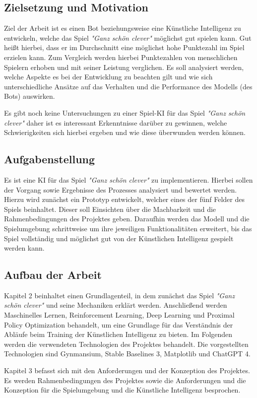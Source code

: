 \subsection{Zielsetzung und Motivation}
Ziel der Arbeit ist es einen Bot beziehungsweise eine Künstliche Intelligenz zu entwickeln, welche das Spiel \textit{"Ganz schön clever"} möglichst gut spielen kann. Gut heißt hierbei, dass er im Durchschnitt eine möglichst hohe Punktezahl im Spiel erzielen kann. Zum Vergleich werden hierbei Punktezahlen von menschlichen Spielern erhoben und mit seiner Leistung verglichen. Es soll analysiert werden, welche Aspekte es bei der Entwicklung zu beachten gilt und wie sich unterschiedliche Ansätze auf das Verhalten und die Performance des Modells (des Bots) auswirken.

Es gibt noch keine Untersuchungen zu einer Spiel-KI für das Spiel \textit{"Ganz schön clever"} daher ist es interessant Erkenntnisse darüber zu gewinnen, welche Schwierigkeiten sich hierbei ergeben und wie diese überwunden werden können.
\subsection{Aufgabenstellung}
Es ist eine KI für das Spiel \textit{"Ganz schön clever"} zu implementieren. Hierbei sollen der Vorgang sowie Ergebnisse des Prozesses analysiert und bewertet werden. Hierzu wird zunächst ein Prototyp entwickelt, welcher eines der fünf Felder des Spiels beinhaltet. Dieser soll Einsichten über die Machbarkeit und die Rahmenbedingungen des Projektes geben. Daraufhin werden das Modell und die Spielumgebung schrittweise um ihre jeweiligen Funktionalitäten erweitert, bis das Spiel vollständig und möglichst gut von der Künstlichen Intelligenz gespielt werden kann.
\subsection{Aufbau der Arbeit}
Kapitel 2 beinhaltet einen Grundlagenteil, in dem zunächst das Spiel \textit{"Ganz schön clever"} und seine Mechaniken erklärt werden. Anschließend werden Maschinelles Lernen, Reinforcement Learning, Deep Learning und Proximal Policy Optimization behandelt, um eine Grundlage für das Verständnis der Abläufe beim Training der Künstlichen Intelligenz zu bieten. Im Folgenden werden die verwendeten Technologien des Projektes behandelt. Die vorgestellten Technologien sind Gynmansium, Stable Baselines 3, Matplotlib und ChatGPT 4.

Kapitel 3 befasst sich mit den Anforderungen und der Konzeption des Projektes. Es werden Rahmenbedingungen des Projektes sowie die Anforderungen und die Konzeption für die Spielumgebung und die Künstliche Intelligenz besprochen.

